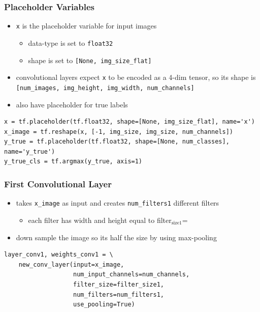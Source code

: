 \documentclass[11pt]{article}
\begin{document}
\subsubsection*{Placeholder Variables}
\label{sec:org418fce8}

\begin{itemize}
\item \texttt{x} is the placeholder variable for input images
\begin{itemize}
\item data-type is set to \texttt{float32}
\item shape is set to \texttt{[None, img\_size\_flat]}
\end{itemize}
\item convolutional layers expect \texttt{x} to be encoded as a 4-dim tensor, so its shape
is \texttt{[num\_images, img\_height, img\_width, num\_channels]}
\item also have placeholder for true labels
\end{itemize}

\begin{verbatim}
x = tf.placeholder(tf.float32, shape=[None, img_size_flat], name='x')
x_image = tf.reshape(x, [-1, img_size, img_size, num_channels])
y_true = tf.placeholder(tf.float32, shape=[None, num_classes], name='y_true')
y_true_cls = tf.argmax(y_true, axis=1)
\end{verbatim}

\subsubsection*{First Convolutional Layer}
\label{sec:org9f332af}

\begin{itemize}
\item takes \texttt{x\_image} as input and creates \texttt{num\_filters1} different filters
\begin{itemize}
\item each filter has width and height equal to filter\(_{\text{size1}}\)=
\end{itemize}
\item down sample the image so its half the size by using max-pooling
\end{itemize}
\begin{verbatim}
layer_conv1, weights_conv1 = \
    new_conv_layer(input=x_image,
                   num_input_channels=num_channels,
                   filter_size=filter_size1,
                   num_filters=num_filters1,
                   use_pooling=True)
\end{verbatim}
\end{document}
